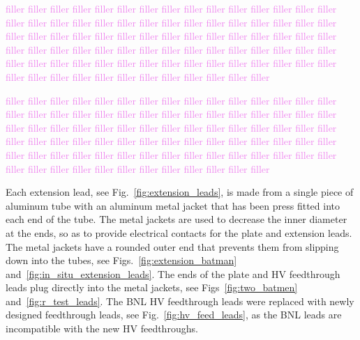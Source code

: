 \textcolor{violet}{filler filler filler filler filler filler filler filler filler filler filler filler filler filler filler filler filler filler filler filler filler filler filler filler filler filler filler filler filler filler filler filler filler filler filler filler filler filler filler filler filler filler filler filler filler filler filler filler filler filler filler filler filler filler filler filler filler filler filler filler filler filler filler filler filler filler filler filler filler filler filler filler filler filler filler filler filler filler filler filler filler filler filler filler filler filler filler}

\textcolor{violet}{filler filler filler filler filler filler filler filler filler filler filler filler filler filler filler filler filler filler filler filler filler filler filler filler filler filler filler filler filler filler filler filler filler filler filler filler filler filler filler filler filler filler filler filler filler filler filler filler filler filler filler filler filler filler filler filler filler filler filler filler filler filler filler filler filler filler filler filler filler filler filler filler filler filler filler filler filler filler filler filler filler filler filler filler filler filler filler}

Each extension lead, see Fig.~\ref{fig:extension_leads}, is made from a single piece of aluminum tube with an aluminum metal jacket that has been press fitted into each end of the tube. The metal jackets are used to decrease the inner diameter at the ends, so as to provide electrical contacts for the plate and extension leads. The metal jackets have a rounded outer end that prevents them from slipping down into the tubes, see Figs.~\ref{fig:extension_batman} and~\ref{fig:in_situ_extension_leads}. The ends of the plate and HV feedthrough leads plug directly into the metal jackets, see Figs~\ref{fig:two_batmen} and~\ref{fig:r_test_leads}. The BNL HV feedthrough leads were replaced with newly designed feedthrough leads, see Fig.~\ref{fig:hv_feed_leads}, as the BNL leads are incompatible with the new HV feedthroughs.

